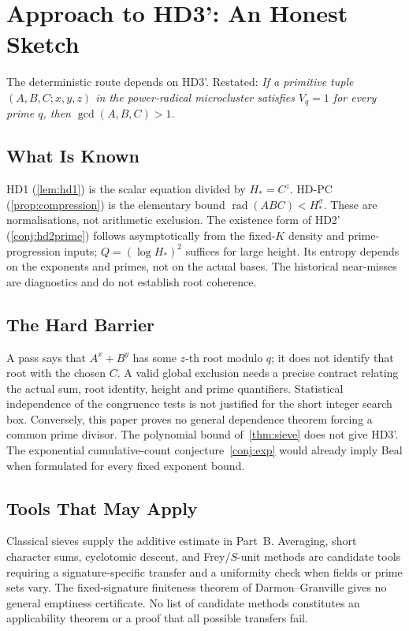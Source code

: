 \documentclass[11pt,a4paper]{article}
\DeclareMathOperator{\rad}{rad}
\begin{document}
\section{Approach to HD3': An Honest Sketch}
\label{sec:hd3-approach}

The deterministic route depends on HD3'. Restated: \emph{If
a primitive tuple $(A,B,C;x,y,z)$ in the power-radical microcluster
satisfies $V_q = 1$ for every prime $q$, then $\gcd(A,B,C) > 1$.}

\subsection*{What Is Known}

HD1 (\cref{lem:hd1}) is the scalar equation divided by $H_*=C^z$.
HD-PC (\cref{prop:compression}) is the elementary bound
$\rad(ABC)<H_*^\sigma$. These are normalisations, not arithmetic
exclusion. The existence form of HD2' (\cref{conj:hd2prime}) follows
asymptotically from the fixed-$K$ density and prime-progression inputs;
$Q=(\log H_*)^2$ suffices for large height. Its entropy depends on
the exponents and primes, not on the actual bases. The historical
near-misses are diagnostics and do not establish root coherence.

\subsection*{The Hard Barrier}

A pass says that $A^x+B^y$ has some $z$-th root modulo $q$;
it does not identify that root with the chosen $C$.
A valid global exclusion needs a precise contract relating the actual
sum, root identity, height and prime quantifiers. Statistical
independence of the congruence tests is not justified for the short
integer search box. Conversely, this paper proves no general
dependence theorem forcing a common prime divisor.
The polynomial bound of~\cref{thm:sieve} does not give HD3'.
The exponential cumulative-count conjecture~\cref{conj:exp} would
already imply Beal when formulated for every fixed exponent bound.

\subsection*{Tools That May Apply}

Classical sieves supply the additive estimate in Part~B.
Averaging, short character sums, cyclotomic descent, and Frey/$S$-unit
methods are candidate tools requiring a signature-specific transfer
and a uniformity check when fields or prime sets vary.
The fixed-signature finiteness theorem of Darmon--Granville
\cite{DarmonGranville1995} gives no general emptiness certificate.
No list of candidate methods constitutes an applicability theorem or
a proof that all possible transfers fail.
\end{document}
